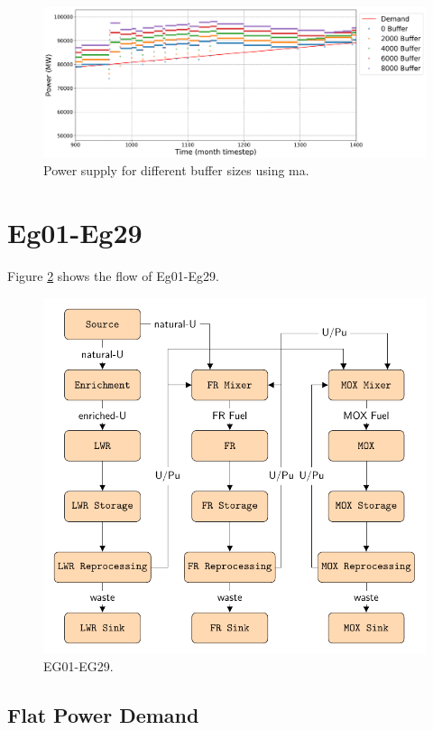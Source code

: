 \documentclass[11pt]{article}
\begin{document}
\begin{figure}[H]
	\centering
	\includegraphics[width=\textwidth]{24-figures/24-power-buffer-fft.png} 
	\hfill
	\caption{Power supply for different buffer sizes using ma.}
	\label{fig:24-buf-fft}
\end{figure}

\section{Eg01-Eg29}

Figure \ref{fig:29flow} shows the flow of Eg01-Eg29.

\begin{figure}[H]
	\centering
	\includegraphics[width=\textwidth]{29-figures/29flow.pdf} 
	\hfill
	\caption{EG01-EG29.}
	\label{fig:29flow}
\end{figure}

\subsection{Flat Power Demand}
\end{document}
